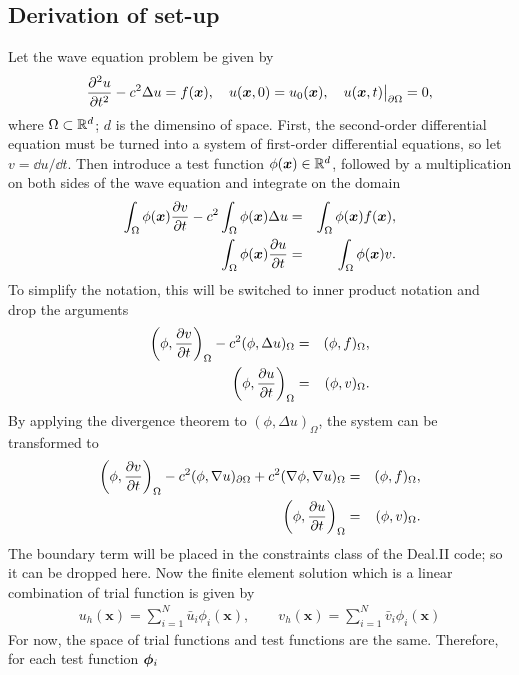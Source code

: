 \subsection{Derivation of set-up}
Let the wave equation problem be given by
\begin{equation}
  \frac{\partial^2u}{\partial t^2} - c^2\Delta u = f(\bm{x}), \quad u(\bm{x},0) = u_0(\bm{x}), \quad u(\bm{x},t)\big|_{\partial\Omega} = 0,
\end{equation}
where $\Omega\subset\mathbb{R}^d$; $d$ is the dimensino of space. First, the second-order differential equation must be turned into a system of first-order differential equations, so let $v=\dd u/\dd t$. Then introduce a test function $\phi(\bm{x})\in\mathbb{R}^d$, followed by a multiplication on both sides of the wave equation and integrate on the domain
\begin{eqnarray*}
  \int_\Omega \phi(\bm{x})\frac{\partial v}{\partial t} - c^2\int_\Omega\phi(\bm{x})\Delta u & = & \int_\Omega \phi(\bm{x})f(\bm{x}), \\
  \int_\Omega \phi(\bm{x})\frac{\partial u}{\partial t} & = & \int_\Omega \phi(\bm{x}) v.
\end{eqnarray*}
To simplify the notation, this will be switched to inner product notation and drop the arguments
\begin{eqnarray*}
  \bigg(\phi,\frac{\partial v}{\partial t}\bigg)_\Omega - c^2(\phi,\Delta u)_\Omega & = & (\phi,f)_\Omega, \\
  \bigg(\phi,\frac{\partial u}{\partial t}\bigg)_\Omega & = & (\phi,v)_\Omega.
\end{eqnarray*}
By applying the divergence theorem to $(\phi,\Delta u)_\Omega$, the system can be transformed to
\begin{eqnarray*}
  \bigg(\phi,\frac{\partial v}{\partial t}\bigg)_\Omega - c^2(\phi,\nabla u)_{\partial\Omega} + c^2(\nabla\phi,\nabla u)_\Omega & = & (\phi,f)_\Omega, \\
  \bigg(\phi,\frac{\partial u}{\partial t}\bigg)_\Omega & = & (\phi,v)_\Omega.
\end{eqnarray*}
The boundary term will be placed in the constraints class of the Deal.II code; so it can be dropped here. Now the finite element solution which is a linear combination of trial function is given by
\begin{eqnarray*}
  u_h(\bm{x}) = \sum^N_{i=1} \bar{u}_i\phi_i(\bm{x}), \quad\quad v_h(\bm{x}) = \sum^N_{i=1} \bar{v}_i\phi_i(\bm{x})
\end{eqnarray*}
For now, the space of trial functions and test functions are the same. Therefore, for each test function $\bm{\phi}_i$
